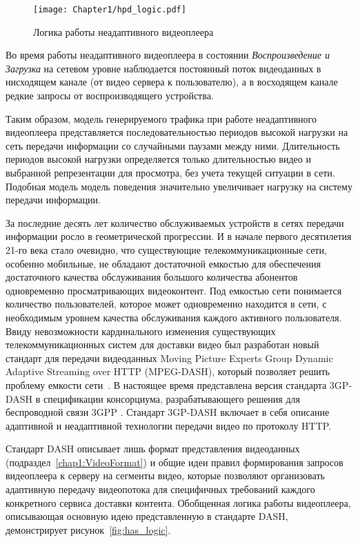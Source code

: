 \begin{figure}[htbp]
\begin{center}
\texttt{[image: Chapter1/hpd\_logic.pdf]}
\caption{Логика работы неадаптивного видеоплеера}
\label{fig:hpd_logic}
\end{center}
\end{figure}

Во время работы неадаптивного видеоплеера в состоянии \textit{Воспроизведение и Загрузка} на сетевом уровне наблюдается постоянный поток видеоданных в нисходящем канале (от видео сервера к пользователю), а в восходящем канале редкие запросы от воспроизводящего устройства.

Таким образом, модель генерируемого трафика при работе неадаптивного видеоплеера представляется последовательностью периодов высокой нагрузки на сеть передачи информации со случайными паузами между ними. Длительность периодов высокой нагрузки определяется только длительностью видео и выбранной репрезентации для просмотра, без учета текущей ситуации в сети. Подобная модель модель поведения значительно увеличивает нагрузку на систему передачи информации.

За последние десять лет количество обслуживаемых устройств в сетях передачи информации росло в геометрической прогрессии. И в начале первого десятилетия 21-го века стало очевидно, что существующие телекоммуникационные сети, особенно мобильные, не обладают достаточной емкостью для обеспечения достаточного качества обслуживания большого количества абонентов одновременно просматривающих видеоконтент. Под емкостью сети понимается количество пользователей, которое может одновременно находится в сети, с необходимым уровнем качества обслуживания каждого активного пользователя. Ввиду невозможности кардинального изменения существующих телекоммуникационных систем для доставки видео был разработан новый стандарт для передачи видеоданных Moving Picture Experts Group Dynamic Adaptive Streaming over HTTP (MPEG-DASH), который позволяет решить проблему емкости сети~\cite{dash_standard}. В настоящее время представлена версия стандарта 3GP-DASH в спецификации консорциума, разрабатывающего решения для беспроводной связи 3GPP \cite{conviva}. Стандарт 3GP-DASH включает в себя описание адаптивной и неадаптивной технологии передачи видео по протоколу HTTP.

Стандарт DASH описывает лишь формат представления видеоданных (подраздел~\ref{chap1:VideoFormat}) и общие идеи правил формирования запросов видеоплеера к серверу на сегменты видео, которые позволяют организовать адаптивную передачу видеопотока для специфичных требований каждого конкретного сервиса доставки контента. Обобщенная логика работы видеоплеера, описывающая основную идею представленную в стандарте DASH, демонстрирует рисунок~\ref{fig:has_logic}.

